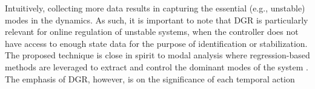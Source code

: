 \documentclass[journal]{IEEEtran}
\theoremstyle{definition}
\theoremstyle{remark}
\begin{document}
%
Intuitively, collecting more data results in capturing the
essential (e.g., unstable) modes in the dynamics.
%
{\color{PineGreen}As such, it is important to note that \ac{DGR} is particularly relevant for
online regulation of unstable systems, when the controller does not have
access to enough state data for the purpose of identification or stabilization.}
%
%
The proposed technique is close in spirit to modal analysis where regression-based methods are leveraged to extract and control the dominant modes of the system \cite{simon1968theory, proctor2016dynamic}.
%
The emphasis of \ac{DGR}, however, is on the significance of each temporal action
\end{document}
